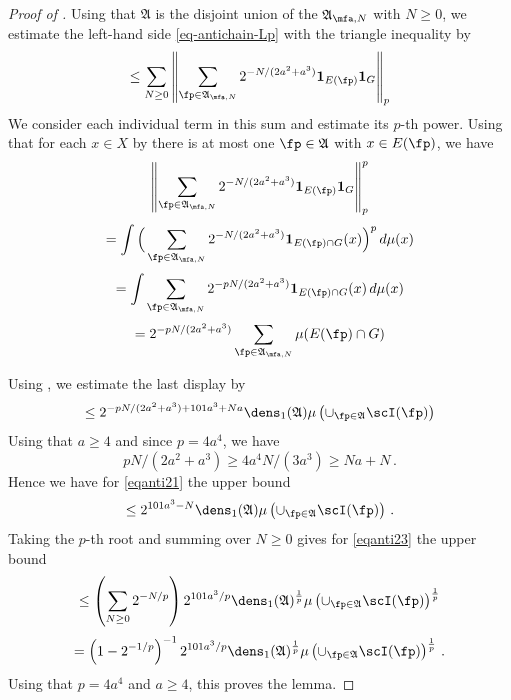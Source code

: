 \begin{proof}[Proof of ]
\leanok
{}

Using that $\mathfrak{A}$ is the disjoint union of the $\mathfrak{A}_{\mfa,N}$ with $N\ge 0$,
we estimate the left-hand side \eqref{eq-antichain-Lp}
with the triangle inequality by
\begin{equation}\label{eqanti23}
\le \sum_{N\ge 0} \left\|\sum_{\fp\in \mathfrak{A}_{\mfa,N}} 2^{-N/(2a^2+a^3)}\mathbf{1}_{E(\fp)} \mathbf{1}_G\right\|_{p}
\end{equation}
We consider each individual term in this sum and estimate its $p$-th power.
Using that for each $x\in X$ by  there is at most one $\fp\in \mathfrak{A}$ with $x\in E(\fp)$, we have
\begin{equation}
    \left\|\sum_{\fp\in \mathfrak{A}_{\mfa,N}} 2^{-N/(2a^2+a^3)}\mathbf{1}_{E(\fp)} \mathbf{1}_G\right\|_{p}^p
\end{equation}
\begin{equation}
    =\int\Big(\sum_{\fp\in \mathfrak{A}_{\mfa,N}}2^{-N/(2a^2+a^3)}\mathbf{1}_{E(\fp)\cap G}(x)\Big)^p\, d\mu(x)
\end{equation}
\begin{equation}
    =\int\sum_{\fp\in\mathfrak{A}_{\mfa,N}}2^{-pN/(2a^2+a^3)}\mathbf{1}_{E(\fp)\cap G}(x)\, d\mu(x)
\end{equation}
\begin{equation}
    = 2^{-pN/(2a^2+a^3)} \sum_{\fp\in\mathfrak{A}_{\mfa,N}}\mu(E(\fp)\cap G)
\end{equation}

Using , we estimate the last display by
\begin{equation}\label{eqanti21}
    \le 2^{-pN/(2a^2+a^3)+101a^3+Na}\dens_1(\mathfrak{A})\mu\left(\cup_{\fp\in\mathfrak{A}}\scI(\fp)\right)
\end{equation}
Using that $a\ge 4$ and since $p = 4a^4$, we have
$$
    pN/(2a^2+a^3)\ge 4a^4N/(3a^3) \ge Na+N\, .
$$
Hence we have for \eqref{eqanti21} the upper bound
$$
    \le 2^{101a^3-N}\dens_1(\mathfrak{A})\mu\left(\cup_{\fp\in\mathfrak{A}}\scI(\fp)\right)\, .
$$
Taking the $p$-th root and summing over $N\ge 0$ gives for \eqref{eqanti23} the upper bound
$$
    \le \left(\sum_{N\ge 0} 2^{-N/p}\right)2^{101a^3/p}\dens_1(\mathfrak{A})^{{\frac{1}{p}}}\mu\left(\cup_{\fp\in\mathfrak{A}}\scI(\fp)\right)^{{\frac{1}{p}}}
$$
$$
    = \left(1-2^{-1/p}\right)^{-1} 2^{101a^3/p} \dens_1(\mathfrak{A})^{\frac 1p}\mu\left(\cup_{\fp\in\mathfrak{A}}\scI(\fp)\right)^{\frac 1p}\, .
$$
Using that $p = 4a^4$ and $a \ge 4$, this proves the lemma.
\end{proof}

